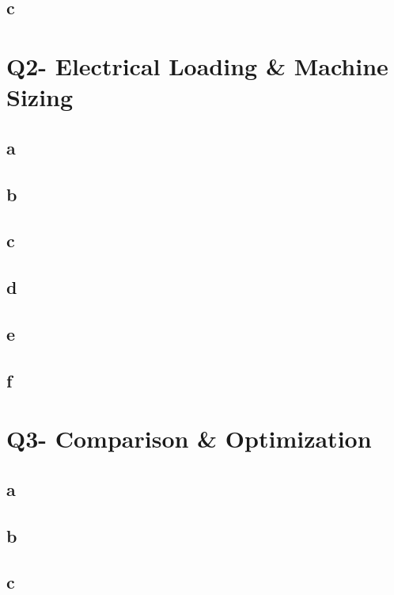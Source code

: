 \documentclass[a4paper, 11pt, titlepage]{article}
\begin{document}
\subsection{c}


\section{Q2- Electrical Loading \& Machine Sizing}


\subsection{a}

\subsection{b}

\subsection{c}

\subsection{d}

\subsection{e}

\subsection{f}


\section{Q3- Comparison \& Optimization}



\subsection{a}

\subsection{b}

\subsection{c}




















\newpage

 

\end{document}
